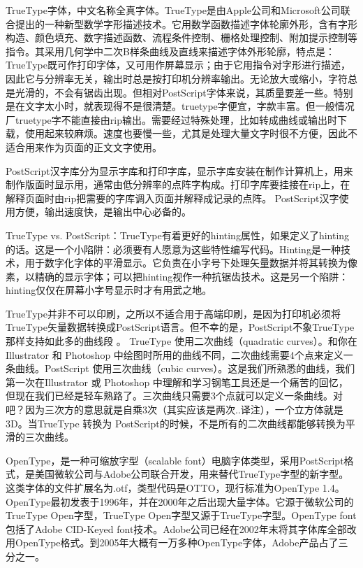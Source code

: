 TrueType字体，中文名称全真字体。TrueType是由Apple公司和Microsoft公司联合提出的一种新型数学字形描述技术。它用数学函数描述字体轮廓外形，含有字形构造、颜色填充、数字描述函数、流程条件控制、栅格处理控制、附加提示控制等指令。其采用几何学中二次B样条曲线及直线来描述字体外形轮廓，特点是：TrueType既可作打印字体，又可用作屏幕显示；由于它用指令对字形进行描述，因此它与分辨率无关，输出时总是按打印机分辨率输出。无论放大或缩小，字符总是光滑的，不会有锯齿出现。但相对PostScript字体来说，其质量要差一些。特别是在文字太小时，就表现得不是很清楚。truetype字便宜，字款丰富。但一般情况厂truetype字不能直接由rip输出。需要经过特殊处理，比如转成曲线或输出时下载，使用起来较麻烦。速度也要慢一些，尤其是处理大量文字时很不方便，因此不适合用来作为页面的正文文字使用。

PostScript汉字库分为显示字库和打印字库，显示字库安装在制作计算机上，用来制作版面时显示用，通常由低分辨率的点阵字构成。打印字库要挂接在rip上，在解释页面时由rip把需要的字库调入页面并解释成记录的点阵。 PostScript汉字使用方便，输出速度快，是输出中心必备的。

TrueType vs. PostScript：TrueType有着更好的hinting属性，如果定义了hinting的话。这是一个小陷阱：必须要有人愿意为这些特性编写代码。Hinting是一种技术，用于数字化字体的平滑显示。它负责在小字号下处理矢量数据并将其转换为像素，以精确的显示字体；可以把hinting视作一种抗锯齿技术。这是另一个陷阱：hinting仅仅在屏幕小字号显示时才有用武之地。

TrueType并非不可以印刷，之所以不适合用于高端印刷，是因为打印机必须将TrueType矢量数据转换成PostScript语言。但不幸的是，PostScript不象TrueType那样支持如此多的曲线段 。
TrueType 使用二次曲线（quadratic curves）。和你在 Illustrator 和 Photoshop 中绘图时所用的曲线不同，二次曲线需要4个点来定义一条曲线。PostScript 使用三次曲线（cubic curves）。这是我们所熟悉的曲线，我们第一次在Illustrator 或 Photoshop 中理解和学习钢笔工具还是一个痛苦的回忆，但现在我们已经是轻车熟路了。三次曲线只需要3个点就可以定义一条曲线。对吧？因为三次方的意思就是自乘3次（其实应该是两次..译注），一个立方体就是3D。当TrueType 转换为 PostScript的时候，不是所有的二次曲线都能够转换为平滑的三次曲线。

OpenType，是一种可缩放字型（scalable font）电脑字体类型，采用PostScript格式，是美国微软公司与Adobe公司联合开发，用来替代TrueType字型的新字型。这类字体的文件扩展名为.otf，类型代码是OTTO，现行标准为OpenType 1.4。OpenType最初发表于1996年，并在2000年之后出现大量字体。它源于微软公司的TrueType Open字型，TrueType Open字型又源于TrueType字型。OpenType font包括了Adobe CID-Keyed font技术。Adobe公司已经在2002年末将其字体库全部改用OpenType格式。到2005年大概有一万多种OpenType字体，Adobe产品占了三分之一。

